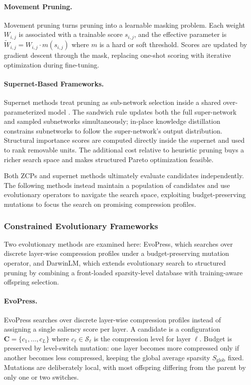 \paragraph{Movement Pruning.}
Movement pruning \cite{sanh2020movement} turns pruning into a learnable masking problem. Each weight $W_{i,j}$ is associated with a trainable score $s_{i,j}$, and the effective parameter is $\widetilde{W}_{i,j} = W_{i,j} \cdot m(s_{i,j})$ where $m$ is a hard or soft threshold. Scores are updated by gradient descent through the mask, replacing one-shot scoring with iterative optimization during fine-tuning.

\paragraph{Supernet-Based Frameworks.}
Supernet methods treat pruning as sub-network selection inside a shared over-parameterized model \cite{Sukthanker2024}. The sandwich rule updates both the full super-network and sampled subnetworks simultaneously; in-place knowledge distillation constrains subnetworks to follow the super-network's output distribution. Structural importance scores are computed directly inside the supernet and used to rank removable units. The additional cost relative to heuristic pruning buys a richer search space and makes structured Pareto optimization feasible.

Both ZCPs and supernet methods ultimately evaluate candidates independently. The following methods instead maintain a population of candidates and use evolutionary operators to navigate the search space, exploiting budget-preserving mutations to focus the search on promising compression profiles.

\subsubsection{Constrained Evolutionary Frameworks}

Two evolutionary methods are examined here: EvoPress, which searches over discrete layer-wise compression profiles under a budget-preserving mutation operator, and DarwinLM, which extends evolutionary search to structured pruning by combining a front-loaded sparsity-level database with training-aware offspring selection.

\paragraph{EvoPress.}
EvoPress \cite{evopress2024} searches over discrete layer-wise compression profiles instead of assigning a single saliency score per layer. A candidate is a configuration $\mathbf{C} = \{c_1,\dots,c_L\}$ where $c_\ell \in \mathcal{S}_\ell$ is the compression level for layer $\ell$. Budget is preserved by level-switch mutation: one layer becomes more compressed only if another becomes less compressed, keeping the global average sparsity $S_{\text{glob}}$ fixed. Mutations are deliberately local, with most offspring differing from the parent by only one or two switches.

